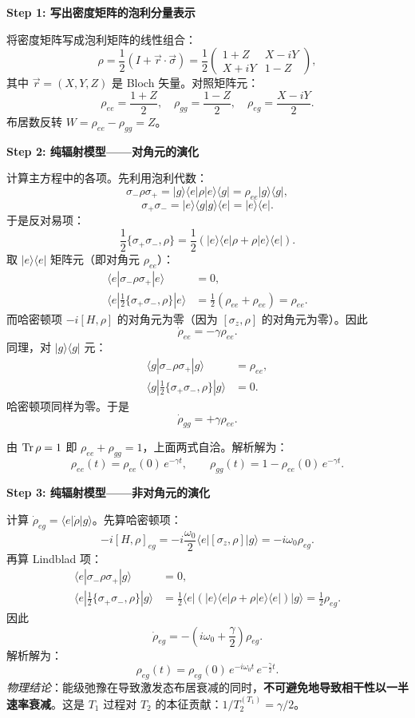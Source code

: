 \begin{derivationbox}[标准解题过程]
\textbf{Step 1: 写出密度矩阵的泡利分量表示}

将密度矩阵写成泡利矩阵的线性组合：
\[
\rho = \frac{1}{2}(I + \vec{r}\cdot\vec{\sigma})
= \frac{1}{2}\begin{pmatrix} 1+Z & X-iY \\ X+iY & 1-Z \end{pmatrix},
\]
其中 $\vec{r}=(X,Y,Z)$ 是 Bloch 矢量。对照矩阵元：
\[
\rho_{ee} = \frac{1+Z}{2}, \quad \rho_{gg} = \frac{1-Z}{2}, \quad \rho_{eg} = \frac{X-iY}{2}.
\]
布居数反转 $W = \rho_{ee}-\rho_{gg} = Z$。

\textbf{Step 2: 纯辐射模型——对角元的演化}

计算主方程中的各项。先利用泡利代数：
\[
\sigma_- \rho \sigma_+ = |g\rangle\langle e|\rho|e\rangle\langle g| = \rho_{ee}|g\rangle\langle g|,
\]
\[
\sigma_+ \sigma_- = |e\rangle\langle g|g\rangle\langle e| = |e\rangle\langle e|.
\]
于是反对易项：
\[
\frac{1}{2}\{ \sigma_+ \sigma_-, \rho \} = \frac{1}{2}(|e\rangle\langle e|\rho + \rho|e\rangle\langle e|).
\]
取 $|e\rangle\langle e|$ 矩阵元（即对角元 $\rho_{ee}$）：
\begin{align*}
\langle e|\sigma_- \rho \sigma_+|e\rangle &= 0, \\
\langle e|\frac{1}{2}\{ \sigma_+ \sigma_-, \rho \}|e\rangle &= \frac{1}{2}(\rho_{ee} + \rho_{ee}) = \rho_{ee}.
\end{align*}
而哈密顿项 $-i[H,\rho]$ 的对角元为零（因为 $[\sigma_z,\rho]$ 的对角元为零）。因此
\[
\boxed{\dot{\rho}_{ee} = -\gamma \rho_{ee}}.
\]
同理，对 $|g\rangle\langle g|$ 元：
\begin{align*}
\langle g|\sigma_- \rho \sigma_+|g\rangle &= \rho_{ee}, \\
\langle g|\frac{1}{2}\{ \sigma_+ \sigma_-, \rho \}|g\rangle &= 0.
\end{align*}
哈密顿项同样为零。于是
\[
\boxed{\dot{\rho}_{gg} = +\gamma \rho_{ee}}.
\]

由 $\Tr\rho=1$ 即 $\rho_{ee}+\rho_{gg}=1$，上面两式自洽。解析解为：
\[
\rho_{ee}(t) = \rho_{ee}(0)\,e^{-\gamma t}, \qquad
\rho_{gg}(t) = 1 - \rho_{ee}(0)\,e^{-\gamma t}.
\]

\textbf{Step 3: 纯辐射模型——非对角元的演化}

计算 $\dot{\rho}_{eg} = \langle e|\dot{\rho}|g\rangle$。先算哈密顿项：
\[
-i[H,\rho]_{eg} = -i\frac{\omega_0}{2}\langle e|[\sigma_z, \rho]|g\rangle = -i\omega_0\rho_{eg}.
\]
再算 Lindblad 项：
\begin{align*}
\langle e|\sigma_- \rho \sigma_+|g\rangle &= 0, \\
\langle e|\frac{1}{2}\{ \sigma_+ \sigma_-, \rho \}|g\rangle &= \frac{1}{2}\langle e|( |e\rangle\langle e|\rho + \rho|e\rangle\langle e| )|g\rangle = \frac{1}{2}\rho_{eg}.
\end{align*}
因此
\[
\boxed{\dot{\rho}_{eg} = -(i\omega_0 + \frac{\gamma}{2})\rho_{eg}}.
\]
解析解为：
\[
\boxed{\rho_{eg}(t) = \rho_{eg}(0)\,e^{-i\omega_0 t}\,e^{-\frac{\gamma}{2}t}}.
\]
\textit{物理结论}：能级弛豫在导致激发态布居衰减的同时，\textbf{不可避免地导致相干性以一半速率衰减}。这是 $T_1$ 过程对 $T_2$ 的本征贡献：$1/T_2^{(T_1)} = \gamma/2$。


\end{derivationbox}
